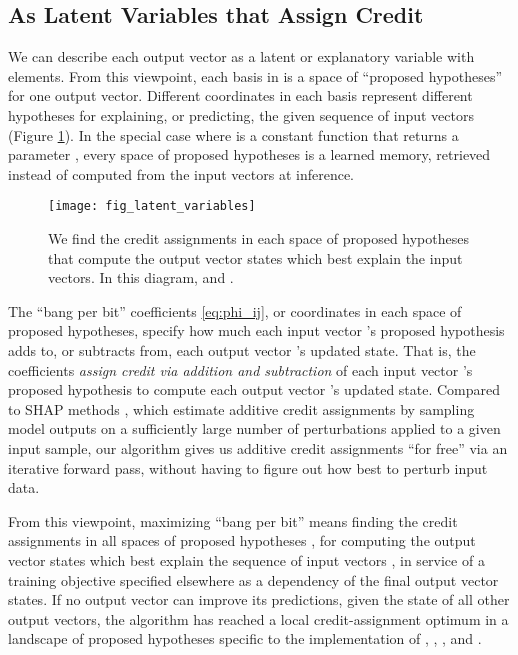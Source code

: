 \documentclass[11pt,a4paper]{article}
\begin{document}
\subsection{As Latent Variables that Assign Credit}

We can describe each output vector as a latent or explanatory variable with  elements. From this viewpoint, each basis in  is a space of ``proposed hypotheses'' for one output vector. Different coordinates in each basis represent different hypotheses for explaining, or predicting, the given sequence of input vectors (Figure \ref{fig:latent_variables}). In the special case where  is a constant function that returns a parameter , every space of proposed hypotheses is a learned memory, retrieved instead of computed from the input vectors at inference.

\begin{figure}[t]
	\vskip 0.1in
	\begin{center}
		\centerline{\texttt{[image: fig\_latent\_variables]}}
		\caption{We find the credit assignments in each space of proposed hypotheses that compute the output vector states which best explain the input vectors. In this diagram,  and .}
		\label{fig:latent_variables}
	\end{center}
	\vskip -0.2in
\end{figure} 


The ``bang per bit'' coefficients  \eqref{eq:phi_ij}, or coordinates in each space of proposed hypotheses, specify how much each input vector 's proposed hypothesis adds to, or subtracts from, each output vector 's updated state. That is, the coefficients {\em assign credit via addition and subtraction} of each input vector 's proposed hypothesis to compute each output vector 's updated state. Compared to SHAP methods \cite{NIPS2017_7062}, which estimate additive credit assignments by sampling model outputs on a sufficiently large number of perturbations applied to a given input sample, our algorithm gives us additive credit assignments ``for free'' via an iterative forward pass, without having to figure out how best to perturb input data.

From this viewpoint, maximizing ``bang per bit'' means finding the credit assignments  in all spaces of proposed hypotheses , for computing the output vector states  which best explain the sequence of input vectors , in service of a training objective specified elsewhere as a dependency of the final output vector states. If no output vector can improve its predictions, given the state of all other output vectors, the algorithm has reached a local credit-assignment optimum in a landscape of proposed hypotheses specific to the implementation of , , , and .
\end{document}

